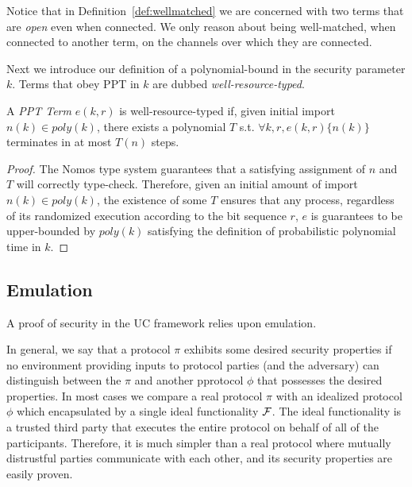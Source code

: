 Notice that in Definition~\ref{def:wellmatched} we are concerned with two terms that are \textit{open} even when connected. 
We only reason about being well-matched, when connected to another term, on the channels over which they are connected.

Next we introduce our definition of a polynomial-bound in the security parameter $k$.
Terms that obey PPT in $k$ are dubbed \textit{well-resource-typed}.
\begin{theorem}[PPT in $k$]\label{thm:ppt}
A \textit{PPT Term} $e(k, r)$ is well-resource-typed if, given initial import $n(k) \in poly(k)$, there exists a polynomial $T$ s.t. $\forall k, r, e(k, r) \{n(k)\}$ terminates in at most $T(n)$ steps. 
\end{theorem}

\begin{proof}
The Nomos type system guarantees that a satisfying assignment of $n$ and $T$ will correctly type-check.
Therefore, given an initial amount of import $n(k) \in poly(k)$, the existence of some $T$ ensures that any process, regardless of its randomized execution according to the bit sequence $r$, $e$ is guarantees to be upper-bounded by $poly(k)$ satisfying the definition of probabilistic polynomial time in $k$.
\end{proof}



\subsection{Emulation}
A proof of security in the UC framework relies upon emulation.

In general, we say that a protocol $\pi$ exhibits some desired security properties if no environment providing inputs to protocol parties (and the adversary) can distinguish between the $\pi$ and another pprotocol $\phi$ that possesses the desired properties.
In most cases we compare a real protocol $\pi$ with an idealized protocol $\phi$ which encapsulated by a single ideal functionality $\mathcal{F}$.
The ideal functionality is a trusted third party that executes the entire protocol on behalf of all of the participants.
Therefore, it is much simpler than a real protocol where mutually distrustful parties communicate with each other, and its security properties are easily proven.


